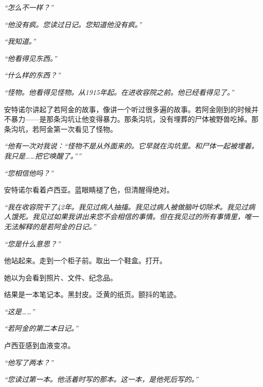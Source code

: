 \noindent \textit{\textquotedblleft{}怎么不一样？\textquotedblright{}}

\noindent \textit{\textquotedblleft{}他没有疯。您读过日记。您知道他没有疯。\textquotedblright{}}

\noindent \textit{\textquotedblleft{}我知道。\textquotedblright{}}

\noindent \textit{\textquotedblleft{}他看得见东西。\textquotedblright{}}

\noindent \textit{\textquotedblleft{}什么样的东西？\textquotedblright{}}

\noindent \textit{\textquotedblleft{}怪物。他看得见怪物。从1915年起。在进收容院之前。他已经看得见了。\textquotedblright{}}

\noindent 安特诺尔讲起了若阿金的故事，像讲一个听过很多遍的故事。若阿金刚到的时候并不暴力——是那条沟坑让他变得暴力。那条沟坑，没有埋葬的尸体被野兽吃掉。那条沟坑，若阿金第一次看见了怪物。

\noindent \textit{\textquotedblleft{}他有一次对我说：\textquotedblleft{}怪物不是从外面来的。它早就在沟坑里。和尸体一起被埋着。我只是……把它唤醒了。\textquotedblright{}\textquotedblright{}}

\noindent \textit{\textquotedblleft{}您相信他吗？\textquotedblright{}}

\noindent 安特诺尔看着卢西亚。蓝眼睛褪了色，但清醒得绝对。

\noindent \textit{\textquotedblleft{}我在收容院干了42年。我见过病人抽搐。我见过病人被做脑叶切除术。我见过病人饿死。我见过如果我讲出来您不会相信的事情。但在我见过的所有事情里，唯一无法解释的是若阿金的日记。\textquotedblright{}}

\noindent \textit{\textquotedblleft{}您是什么意思？\textquotedblright{}}

\noindent 他站起来。走到一个柜子前。取出一个鞋盒。打开。

\noindent 她以为会看到照片、文件、纪念品。

\noindent 结果是一本笔记本。黑封皮。泛黄的纸页。颤抖的笔迹。

\noindent \textit{\textquotedblleft{}这是……\textquotedblright{}}

\noindent \textit{\textquotedblleft{}若阿金的第二本日记。\textquotedblright{}}

\noindent 卢西亚感到血液变凉。

\noindent \textit{\textquotedblleft{}他写了两本？\textquotedblright{}}

\noindent \textit{\textquotedblleft{}您读过第一本。他活着时写的那本。这一本，是他死后写的。\textquotedblright{}}

